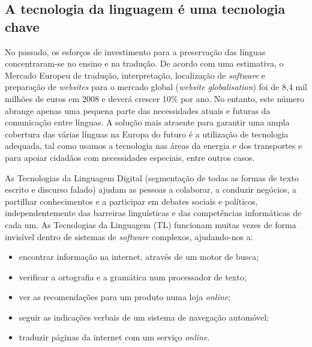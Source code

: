 \documentclass[]{../metanetpaper}
\begin{document}
\begin{multicols}{2}

\subsection{A tecnologia da linguagem é uma tecnologia chave}

 No passado, os esforços de investimento para a preservação das línguas concentraram-se no ensino e na tradução. De acordo com uma estimativa, o Mercado Europeu de tradução, interpretação, localização de \textit{software} e preparação de \textit{websites} para o mercado global (\textit{website globalisation}) foi de 8,4 mil milhões de euros em 2008 e deverá crescer 10\% por ano\cite{EC3}. No entanto, este número abrange apenas uma pequena parte das necessidades atuais e futuras da comunicação entre línguas. A solução mais atraente para garantir uma ampla cobertura das várias línguas na Europa do futuro é a utilização de tecnologia adequada, tal como usamos a tecnologia nas áreas da energia e dos transportes e para apoiar cidadãos com necessidades especiais, entre outros casos.


As Tecnologias da Linguagem Digital (segmentação de todas as formas de texto escrito e discurso falado) ajudam as pessoas a colaborar, a conduzir negócios, a partilhar conhecimentos e a participar em debates sociais e políticos, independentemente das barreiras linguísticas e das competências informáticas de cada um. As Tecnologias da Linguagem (TL) funcionam muitas vezes de forma invisível dentro de sistemas de \textit{software} complexos, ajudando-nos a:

\begin{itemize}
  \item encontrar informação na internet, através de um motor de busca;
      \item verificar a ortografia e a gramática num processador de texto;
      \item ver as recomendações para um produto numa loja \textit{online};
      \item seguir as indicações verbais de um sistema de navegação automóvel;
      \item traduzir páginas da internet com um serviço \textit{online}.
\end{itemize}


\end{multicols}
\end{document}
